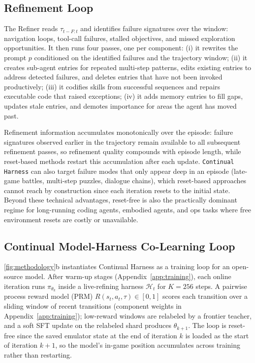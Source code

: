 \subsection{Refinement Loop}\label{sec:refinement}

The Refiner reads $\tau_{t-F:t}$ and identifies failure signatures over the window: navigation loops, tool-call failures, stalled objectives, and missed exploration opportunities. It then runs four passes, one per component: (i) it rewrites the prompt $p$ conditioned on the identified failures and the trajectory window; (ii) it creates sub-agent entries for repeated multi-step patterns, edits existing entries to address detected failures, and deletes entries that have not been invoked productively; (iii) it codifies skills from successful sequences and repairs executable code that raised exceptions; (iv) it adds memory entries to fill gaps, updates stale entries, and demotes importance for areas the agent has moved past.

Refinement information accumulates monotonically over the episode: failure signatures observed earlier in the trajectory remain available to all subsequent refinement passes, so refinement quality compounds with episode length, while reset-based methods restart this accumulation after each update. \texttt{Continual Harness} can also target failure modes that only appear deep in an episode (late-game battles, multi-step puzzles, dialogue chains), which reset-based approaches cannot reach by construction since each iteration resets to the initial state. Beyond these technical advantages, reset-free is also the practically dominant regime for long-running coding agents, embodied agents, and ops tasks where free environment resets are costly or unavailable.

\subsection{Continual Model-Harness Co-Learning Loop}\label{sec:training}

\cref{fig:methodology}b instantiates Continual Harness as a training loop for an open-source model. After warm-up stages (Appendix~\ref{app:training}), each online iteration runs $\pi_{\theta_k}$ inside a live-refining harness $\mathcal{H}_t$ for $K{=}256$ steps. A pairwise process reward model (PRM) $R(s_t, a_t, \tau) \in [0,1]$ scores each transition over a sliding window of recent transitions (component weights in Appendix~\ref{app:training}); low-reward windows are relabeled by a frontier teacher, and a soft SFT update on the relabeled shard produces $\theta_{k+1}$. The loop is reset-free since the saved emulator state at the end of iteration $k$ is loaded as the start of iteration $k{+}1$, so the model's in-game position accumulates across training rather than restarting.

